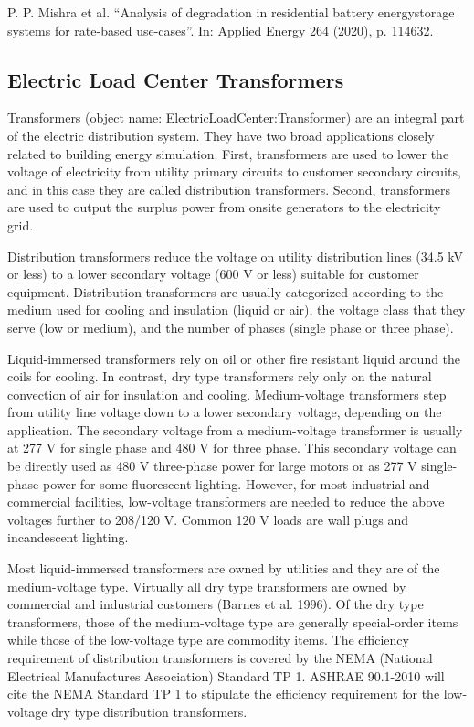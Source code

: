 \noindent
P. P. Mishra et al. “Analysis of degradation in residential battery energystorage systems for rate-based use-cases”. In: Applied Energy 264 (2020), p. 114632.

\subsection{Electric Load Center Transformers}\label{electric-load-center-transformers}

Transformers (object name: ElectricLoadCenter:Transformer) are an integral part of the electric distribution system. They have two broad applications closely related to building energy simulation. First, transformers are used to lower the voltage of electricity from utility primary circuits to customer secondary circuits, and in this case they are called distribution transformers. Second, transformers are used to output the surplus power from onsite generators to the electricity grid.

Distribution transformers reduce the voltage on utility distribution lines (34.5 kV or less) to a lower secondary voltage (600 V or less) suitable for customer equipment. Distribution transformers are usually categorized according to the medium used for cooling and insulation (liquid or air), the voltage class that they serve (low or medium), and the number of phases (single phase or three phase).

Liquid-immersed transformers rely on oil or other fire resistant liquid around the coils for cooling. In contrast, dry type transformers rely only on the natural convection of air for insulation and cooling. Medium-voltage transformers step from utility line voltage down to a lower secondary voltage, depending on the application. The secondary voltage from a medium-voltage transformer is usually at 277 V for single phase and 480 V for three phase. This secondary voltage can be directly used as 480 V three-phase power for large motors or as 277 V single-phase power for some fluorescent lighting. However, for most industrial and commercial facilities, low-voltage transformers are needed to reduce the above voltages further to 208/120 V. Common 120 V loads are wall plugs and incandescent lighting.

Most liquid-immersed transformers are owned by utilities and they are of the medium-voltage type. Virtually all dry type transformers are owned by commercial and industrial customers (Barnes et al. 1996). Of the dry type transformers, those of the medium-voltage type are generally special-order items while those of the low-voltage type are commodity items. The efficiency requirement of distribution transformers is covered by the NEMA (National Electrical Manufactures Association) Standard TP 1. ASHRAE 90.1-2010 will cite the NEMA Standard TP 1 to stipulate the efficiency requirement for the low-voltage dry type distribution transformers.


